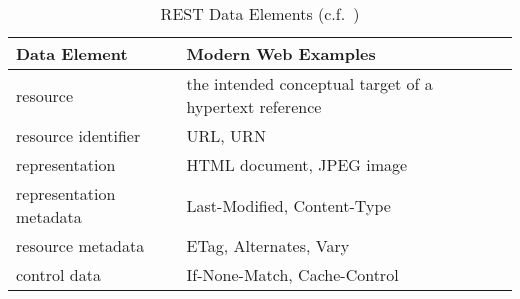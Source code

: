 \begin{table}[h]\small
\begin{tabular}{l l}
\toprule[0.15em]
    {\bf Data Element}
    &{\bf Modern Web Examples}
\\\midrule[0.15em]
    {resource}
    &{the intended conceptual target of a hypertext reference}
\\\midrule
    {resource identifier}
    &{URL, URN}
\\\midrule
    {representation}
    &{HTML document, JPEG image}
\\\midrule
    {representation metadata}
    &{Last-Modified, Content-Type}
\\\midrule
    {resource metadata}
    &{ETag, Alternates, Vary}
\\\midrule
    {control data}
    &{If-None-Match, Cache-Control}
\\\bottomrule[0.1em]
\end{tabular}
\centering
\caption{REST Data Elements (c.f.\ \cite[p.~88]{Fie00})}
\label{REST_Data_Elements}
\end{table}
